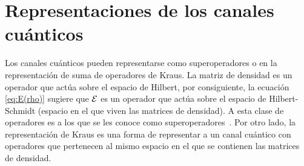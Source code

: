 

\section{Representaciones de los canales cuánticos} %
\label{sec:qtm-channels-representation}

Los canales cuánticos pueden representarse como superoperadores
o en la representación de suma de operadores de Kraus. 
La matriz de densidad es un operador que actúa sobre el espacio 
de Hilbert, por consiguiente, la ecuación \eqref{eq:E(rho)} 
sugiere que $\mathcal{E}$ es un operador que actúa sobre el espacio 
de Hilbert-Schmidt (espacio en el que viven las matrices de densidad). 
A esta clase de operadores es a los que se les conoce como 
superoperadores~\cite{preskill1998lecture}.
Por otro lado, la representación de Kraus es una forma de 
representar a un canal cuántico con operadores que pertenecen
al mismo espacio en el que se contienen las matrices de densidad.

